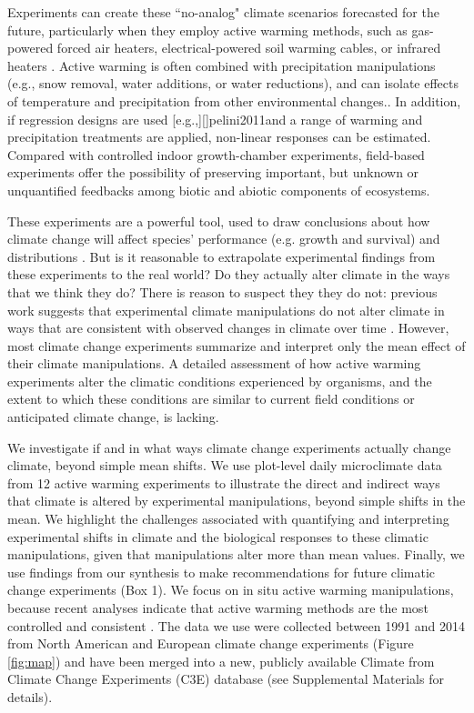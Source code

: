 \documentclass{article}
\begin{document}
Experiments can create these ``no-analog" climate scenarios forecasted for the future, particularly when they employ active warming methods, such as gas-powered forced air heaters, electrical-powered soil warming cables, or infrared heaters \citep{shaver2000,williams2007b,aronson2009}. Active warming is often combined with precipitation manipulations (e.g., snow removal, water additions, or water reductions), and can isolate effects of temperature and precipitation from other environmental changes.\citep [e.g.,][]{price1998,cleland2006,sherry2007,rollinson2012}. In addition, if regression designs are used [e.g.,][]{pelini2011}and a range of warming and precipitation treatments are applied, non-linear responses can be estimated. Compared with controlled indoor growth-chamber experiments, field-based experiments offer the possibility of preserving important, but unknown or unquantified feedbacks among biotic and abiotic components of ecosystems. 
\par These experiments are a powerful tool, used to draw conclusions about how climate change will affect species' performance (e.g. growth and survival) and distributions \citep{dukes1999,hobbie1999,reich2015,gruner2016}. But is it reasonable to extrapolate experimental findings from these experiments to the real world? Do they actually alter climate in the ways that we think they do? There is reason to suspect they they do not: previous work suggests that experimental climate manipulations do not alter climate in ways that are consistent with observed changes in climate over time \citep{wolkovich2012}. However, most climate change experiments summarize and interpret only the mean effect of their climate manipulations. A detailed assessment of how active warming experiments alter the climatic conditions experienced by organisms, and the extent to which these conditions are similar to current field conditions or anticipated climate change, is lacking. 
\par We investigate if and in what ways climate change experiments actually change climate, beyond simple mean shifts. We use plot-level daily microclimate data from 12 active warming experiments to illustrate the direct and indirect ways that climate is altered by experimental manipulations, beyond simple shifts in the mean. We highlight the challenges associated with quantifying and interpreting experimental shifts in climate and the biological responses to these climatic manipulations, given that manipulations alter more than mean values. Finally, we use findings from our synthesis to make recommendations for future climatic change experiments (Box 1). We focus on in situ active warming manipulations, because recent analyses indicate that active warming methods are the most controlled and consistent \citep{kimball2005,kimball2008,aronson2009,wolkovich2012}. The data we use were collected between 1991 and 2014 from North American and European climate change experiments (Figure \ref{fig:map}) and have been merged into a new, publicly available Climate from Climate Change Experiments (C3E) database (see Supplemental Materials for details). 
\end{document}
